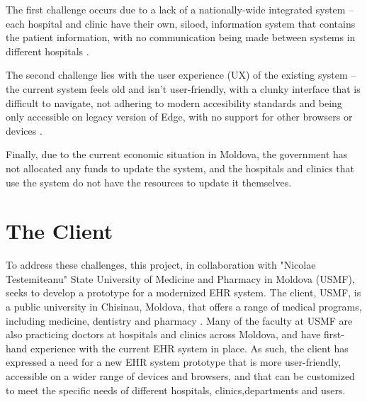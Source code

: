 The first challenge occurs due to a lack of a nationally-wide integrated system -- each hospital and clinic have their own, siloed, information system that contains the patient information, with no communication being made between systems in different hospitals \parencite{mdehr}. 

The second challenge lies with the user experience (UX) of the existing system -- the current system feels old and isn't user-friendly, with a clunky interface that is difficult to navigate, not adhering to modern accesibility standards and being only accessible on legacy version of Edge, with no support for other browsers or devices \parencite{mdehr}. 

Finally, due to the current economic situation in Moldova, the government has not allocated any funds to update the system, and the hospitals and clinics that use the system do not have the resources to update it themselves. 

\section{The Client}

To address these challenges, this project, in collaboration with "Nicolae Testemiteanu" State University of Medicine and Pharmacy in Moldova (USMF), seeks to develop a prototype for a modernized EHR system. The client, USMF, is a public university in Chisinau, Moldova, that offers a range of medical programs, including medicine, dentistry and pharmacy \parencite{mduni}. Many of the faculty at USMF are also practicing doctors at hospitals and clinics across Moldova, and have first-hand experience with the current EHR system in place. As such, the client has expressed a need for a new EHR system prototype that is more user-friendly, accessible on a wider range of devices and browsers, and that can be customized to meet the specific needs of different hospitals, clinics,departments and users.